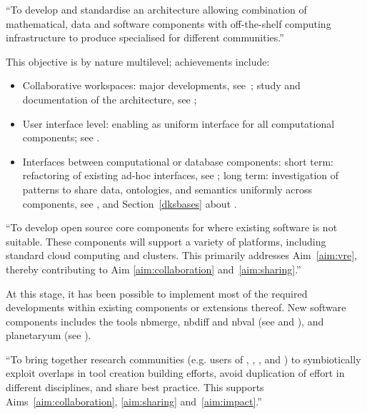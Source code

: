 \begin{compactenum}
\item\label{objective:framework} ``To develop and standardise an
  architecture allowing combination of mathematical, data and software
  components with off-the-shelf computing infrastructure to produce
  specialised \VREs for different communities.''

  This objective is by nature multilevel; achievements include:
  \begin{itemize}
  \item Collaborative workspaces: major \JupyterHub developments,
    see~; study and documentation of
    the \SMC architecture, see
    ;
  \item User interface level: enabling \Jupyter as uniform interface
    for all computational components; see
    .
  \item Interfaces between computational or database components: short
    term: refactoring of existing ad-hoc interfaces, see
    ; long term: investigation of
    patterns to share data, ontologies, and semantics uniformly across
    components, see
    , and
    Section~\ref{dksbases} about .
  \end{itemize}

\item\label{objectives:core} ``To develop open source core components
  for \VREs where existing software is not suitable. These components
  will support a variety of platforms, including standard cloud
  computing and clusters. This primarily addresses Aim~\ref{aim:vre},
  thereby contributing to Aim \ref{aim:collaboration}
  and~\ref{aim:sharing}.''

  At this stage, it has been possible to implement most of the
  required developments within existing components or extensions
  thereof. New software components includes the tools nbmerge, nbdiff and nbval
  (see  and ),
  and planetaryum (see ).

\item \label{objective:community} ``To bring together research
  communities (e.g. users of \Jupyter, \Sage, \Singular, and \GAP) to
  symbiotically exploit overlaps in tool creation building efforts,
  avoid duplication of effort in different disciplines, and share best
  practice. This supports Aims~\ref{aim:collaboration},
  \ref{aim:sharing} and~\ref{aim:impact}.''


\end{compactenum}
